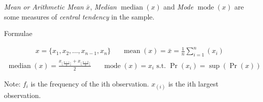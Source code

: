 \documentclass[
]{article}
\begin{document}
\emph{Mean or Arithmetic Mean} \(\bar{x}\), \emph{Median}
\(\operatorname{median}(x)\) and \emph{Mode} \(\operatorname{mode}(x)\)
are some measures of \emph{central tendency} in the sample.

Formulae

\[
\begin{aligned}
x = \{x_1, x_2, \ldots,x_{n-1}, x_n\} &&
\operatorname{mean}(x)=\bar{x} = \frac{1}{n} \sum _{i=1}^{n}(x_{i})
\end{aligned}
\]\[
\begin{aligned}
\operatorname{median}(x)= \frac{x_{\lfloor\frac{n+1}{2}\rfloor}+x_{\lfloor\frac{n+2}{2}\rfloor}}{2} &&
\operatorname{mode}(x) = x_i \text{ s.t. } \operatorname{Pr}(x_i) = \operatorname{sup}(\operatorname{Pr}(x))  
\end{aligned}
\]

Note: \(f_i\) is the frequency of the ith observation. \(x_{(i)}\) is
the ith largest observation.
\end{document}
